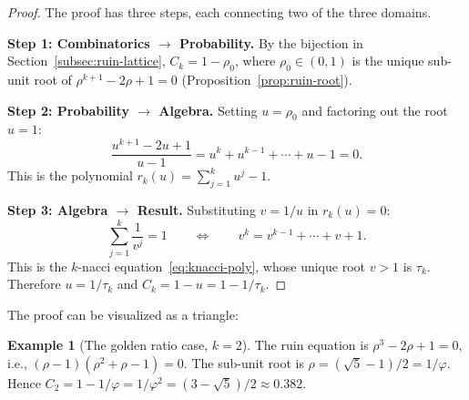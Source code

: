 \documentclass[11pt]{article}
\theoremstyle{definition}
\newtheorem{example}[theorem]{Example}
\theoremstyle{remark}
\begin{document}
\begin{proof}
The proof has three steps, each connecting two of the three domains.

\medskip\noindent\textbf{Step 1: Combinatorics $\to$ Probability.}
By the bijection in Section~\ref{subsec:ruin-lattice},
$C_k = 1 - \rho_0$, where $\rho_0 \in (0,1)$ is the unique
sub-unit root of
$\rho^{k+1} - 2\rho + 1 = 0$
(Proposition~\ref{prop:ruin-root}).

\medskip\noindent\textbf{Step 2: Probability $\to$ Algebra.}
Setting $u = \rho_0$ and factoring out the root $u = 1$:
\[
\frac{u^{k+1} - 2u + 1}{u - 1}
= u^k + u^{k-1} + \cdots + u - 1 = 0.
\]
This is the polynomial $r_k(u) = \sum_{j=1}^{k} u^j - 1$.

\medskip\noindent\textbf{Step 3: Algebra $\to$ Result.}
Substituting $v = 1/u$ in $r_k(u) = 0$:
\[
\sum_{j=1}^{k} \frac{1}{v^j} = 1
\qquad\Longleftrightarrow\qquad
v^k = v^{k-1} + \cdots + v + 1.
\]
This is the $k$-nacci equation~\eqref{eq:knacci-poly}, whose unique root
$v > 1$ is $\tau_k$.
Therefore $u = 1/\tau_k$ and $C_k = 1 - u = 1 - 1/\tau_k$.
\end{proof}

The proof can be visualized as a triangle:

\begin{center}
\end{center}

\begin{example}[The golden ratio case, $k = 2$]\label{ex:golden}
The ruin equation is $\rho^3 - 2\rho + 1 = 0$, i.e.,
$(\rho - 1)(\rho^2 + \rho - 1) = 0$.
The sub-unit root is $\rho = (\sqrt{5} - 1)/2 = 1/\varphi$.
Hence $C_2 = 1 - 1/\varphi = 1/\varphi^2 = (3 - \sqrt{5})/2
\approx 0.382$.
\end{example}
\end{document}
